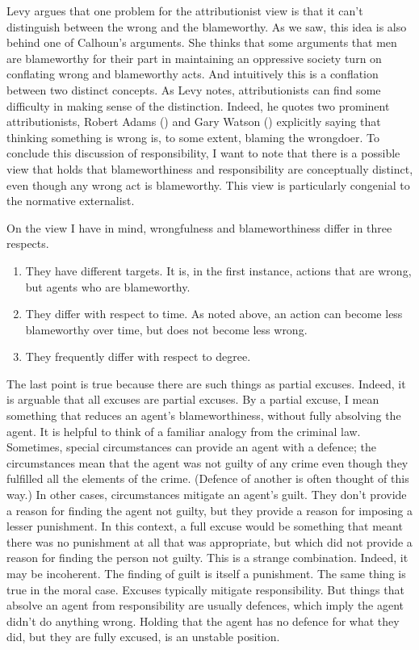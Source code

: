 \documentclass[
  10pt,
  letterpaper,
  twoside]{scrbook}
\providecommand{\tightlist}{%
  \setlength{\itemsep}{0pt}\setlength{\parskip}{0pt}}\usepackage{longtable,booktabs,array}
\begin{document}
Levy argues that one problem for the attributionist view is that it
can't distinguish between the wrong and the blameworthy. As we saw, this
idea is also behind one of Calhoun's arguments. She thinks that some
arguments that men are blameworthy for their part in maintaining an
oppressive society turn on conflating wrong and blameworthy acts. And
intuitively this is a conflation between two distinct concepts. As Levy
notes, attributionists can find some difficulty in making sense of the
distinction. Indeed, he quotes two prominent attributionists, Robert
Adams () and Gary Watson
() explicitly saying that thinking
something is wrong is, to some extent, blaming the wrongdoer. To
conclude this discussion of responsibility, I want to note that there is
a possible view that holds that blameworthiness and responsibility are
conceptually distinct, even though any wrong act is blameworthy. This
view is particularly congenial to the normative externalist.

On the view I have in mind, wrongfulness and blameworthiness differ in
three respects.

\begin{enumerate}
\def\labelenumi{\arabic{enumi}.}
\tightlist
\item
  They have different targets. It is, in the first instance, actions
  that are wrong, but agents who are blameworthy.
\item
  They differ with respect to time. As noted above, an action can become
  less blameworthy over time, but does not become less wrong.
\item
  They frequently differ with respect to degree.
\end{enumerate}

The last point is true because there are such things as partial excuses.
Indeed, it is arguable that all excuses are partial excuses. By a
partial excuse, I mean something that reduces an agent's
blameworthiness, without fully absolving the agent. It is helpful to
think of a familiar analogy from the criminal law. Sometimes, special
circumstances can provide an agent with a defence; the circumstances
mean that the agent was not guilty of any crime even though they
fulfilled all the elements of the crime. (Defence of another is often
thought of this way.) In other cases, circumstances mitigate an agent's
guilt. They don't provide a reason for finding the agent not guilty, but
they provide a reason for imposing a lesser punishment. In this context,
a full excuse would be something that meant there was no punishment at
all that was appropriate, but which did not provide a reason for finding
the person not guilty. This is a strange combination. Indeed, it may be
incoherent. The finding of guilt is itself a punishment. The same thing
is true in the moral case. Excuses typically mitigate responsibility.
But things that absolve an agent from responsibility are usually
defences, which imply the agent didn't do anything wrong. Holding that
the agent has no defence for what they did, but they are fully excused,
is an unstable position.
\end{document}
